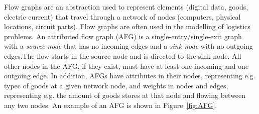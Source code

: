 Flow graphs are an abstraction used to represent elements (\eg digital data, goods, electric current) that travel through a network of nodes (\eg computers, physical locations, circuit parts). Flow graphs are often used in the modelling of logistics problems. An attributed flow graph (AFG) is a single-entry/single-exit graph with a \emph{source node} that has no incoming edges and a \emph{sink node} with no outgoing edges.The flow starts in the source node and is directed to the sink node. All other nodes in the AFG, if they exist, must have at least one incoming and one outgoing edge. In addition, AFGs have attributes in their nodes, representing e.g. typec of goods at a given network node, and weights in nodes and edges, representing e.g. the amount of goods stores at that node and flowing between any two nodes. An example of an AFG is shown in Figure~\ref{fig:AFG}.

